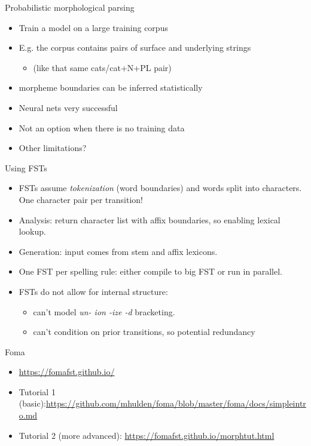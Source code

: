 \documentclass{beamer}
\begin{document}
\begin{frame}{Probabilistic morphological parsing}
  \begin{itemize}
  \item Train a model on a large training corpus
  \item E.g. the corpus contains pairs of surface and underlying strings
    \begin{itemize}
    \item (like that same cats/cat+N+PL pair)
    \end{itemize}
  \item morpheme boundaries can be inferred statistically
  \item Neural nets very successful
  \item Not an option when there is no training data
  \item Other limitations?
  \end{itemize}
\end{frame}

\begin{frame}{Using FSTs}
  \begin{itemize}
  \item FSTs assume \emph{tokenization} (word boundaries) and words
    split into characters.  One character pair per transition!
  \item Analysis: return character list with affix boundaries, so
    enabling lexical lookup.
  \item Generation: input comes from stem and affix lexicons.
  \item One FST per spelling rule: either compile to big FST or run in
    parallel.
  \item FSTs do not allow for internal structure:
    \begin{itemize}
    \item can't model {\it un- ion -ize -d} bracketing.
    \item can't condition on prior transitions, so potential
      redundancy
    \end{itemize}
  \end{itemize}
\end{frame}

\begin{frame}{Foma}
  \begin{itemize}
  \item \url{https://fomafst.github.io/}
  \item Tutorial 1 (basic):\url{https://github.com/mhulden/foma/blob/master/foma/docs/simpleintro.md}
  \item Tutorial 2 (more advanced): \url{https://fomafst.github.io/morphtut.html}
  \end{itemize}
\end{frame}
\end{document}
